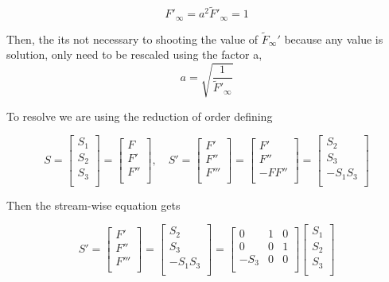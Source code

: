 \begin{equation*}
F'_\infty
=
a^2
\tilde{F}'_\infty
=1
\end{equation*}

Then, the its not necessary to shooting the value of $\tilde{F}_\infty'$
because any value is solution, only need to be rescaled using the factor a,  
\begin{equation*}
a
=\sqrt{\frac{1}{\tilde{F}'_\infty}}
\end{equation*}

To resolve we are using the reduction of order
defining

\begin{equation}
    S=
\begin{bmatrix}
   S_1\\ 
   S_2\\
   S_3\\
\end{bmatrix}
=
\begin{bmatrix}
   F\\ 
   F'\\
   F''\\
\end{bmatrix}
,
\quad
S'=
\begin{bmatrix}
   F'\\ 
   F''\\
   F'''\\
\end{bmatrix}
=
\begin{bmatrix}
   F'\\ 
   F''\\
   -FF''\\
\end{bmatrix}
=
\begin{bmatrix}
S_2\\
S_3\\
-S_1S_3\\
\end{bmatrix}
\end{equation}

Then the stream-wise equation gets  

\begin{equation}
S'=
\begin{bmatrix}
   F'\\ 
   F''\\
   F'''\\
\end{bmatrix}
=
\begin{bmatrix}
S_2\\
S_3\\
-S_1S_3\\
\end{bmatrix}
=
\begin{bmatrix}
0    & 1 & 0\\
0    & 0 & 1\\
-S_3 & 0 & 0\\
\end{bmatrix}
\begin{bmatrix}
   S_1\\ 
   S_2\\
   S_3\\
\end{bmatrix}
\end{equation}

